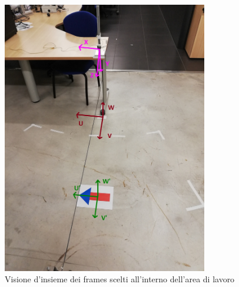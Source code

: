 \begin{figure}[H]
	\centering
	\includegraphics[width=0.8\textwidth]{Immagini/camera_opposite_pov.jpg}
	\caption{Visione d'insieme dei frames scelti all'interno dell'area di lavoro}
	\label{fig:all_frames}
\end{figure}

